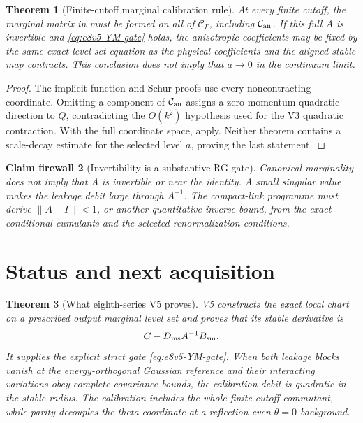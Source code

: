 \documentclass[11pt,oneside]{book}
\newtheorem{theorem}{Theorem}[chapter]
\newtheorem{firewall}[theorem]{Claim firewall}
\theoremstyle{definition}
\theoremstyle{remark}
\begin{document}
\begin{theorem}[Finite-cutoff marginal calibration rule]
\label{thm:e8v5-full-calibration}
At every finite cutoff, the marginal matrix in
 must be formed on all of
\({\mathcal C}_\Gamma\), including \({\mathcal C}_{\rm an}\).
If this full \(A\) is invertible and
\eqref{eq:e8v5-YM-gate} holds, the anisotropic coefficients may be
fixed by the same exact level-set equation as the physical
coefficients and the aligned stable map contracts.  This conclusion
does not imply that \(a\to0\) in the continuum limit.
\end{theorem}

\begin{proof}
The implicit-function and Schur proofs use every noncontracting
coordinate.  Omitting a component of
\({\mathcal C}_{\rm an}\) assigns a zero-momentum quadratic direction
to \(Q\), contradicting the \(O(k^2)\) hypothesis used for the V3
quadratic contraction.  With the full coordinate space,
 apply.  Neither theorem contains
a scale-decay estimate for the selected level \(a\), proving the last
statement.
\end{proof}

\begin{firewall}[Invertibility is a substantive RG gate]
\label{fire:e8v5-invertibility}
Canonical marginality does not imply that \(A\) is invertible or
near the identity.  A small singular value makes the leakage debit
large through \(A^{-1}\).  The compact-link programme must derive
\(\|A-I\|<1\), or another quantitative inverse bound, from the exact
conditional cumulants and the selected renormalization conditions.
\end{firewall}

\section{Status and next acquisition}
\label{sec:e8v5-status}

\begin{theorem}[What eighth-series V5 proves]
\label{thm:e8v5-result}
V5 constructs the exact local chart on a prescribed output marginal
level set and proves that its stable derivative is
\[
 C-D_{\rm ms}A^{-1}B_{\rm sm}.
\]
It supplies the explicit strict gate
\eqref{eq:e8v5-YM-gate}.  When both leakage blocks vanish at the
energy-orthogonal Gaussian reference and their interacting variations
obey complete covariance bounds, the calibration debit is quadratic
in the stable radius.  The calibration includes the whole
finite-cutoff commutant, while parity decouples the theta coordinate
at a reflection-even \(\theta=0\) background.
\end{theorem}
\end{document}

